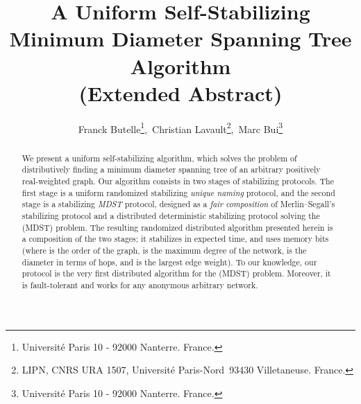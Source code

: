 \documentclass[10pt]{article}
\begin{document}
\title{A Uniform Self-Stabilizing \\
Minimum Diameter Spanning Tree Algorithm \\
{\small (Extended Abstract)}}

\author{Franck Butelle\thanks{Universit\'{e} Paris 10 
- 92000 Nanterre. France.},\  
Christian Lavault\thanks{LIPN, CNRS URA 1507, 
Universit\'{e} Paris-Nord\ 93430 Villetaneuse. France.},\ 
Marc Bui\thanks{Universit\'{e} Paris 10 - 92000 Nanterre. France.}
}
\date{\empty}
\maketitle

\begin{abstract}
We present a uniform self-stabilizing algorithm, which solves the
problem of distributively finding a minimum diameter spanning tree of
an arbitrary positively real-weighted graph. Our algorithm consists
in two stages of stabilizing protocols. The first stage is a uniform
randomized stabilizing {\em unique naming} protocol, and the second
stage is a stabilizing {\em MDST} protocol, designed as a {\em fair
composition} of Merlin--Segall's stabilizing protocol and a
distributed deterministic stabilizing protocol solving the (MDST)
problem. The resulting randomized distributed algorithm presented
herein is a composition of the two stages; it stabilizes in
 expected time, and uses  memory bits (where  is the order of
the graph,  is the maximum degree of the network, 
is the diameter in terms of hops, and  is
the largest edge weight). To our knowledge, our protocol is the very
first distributed algorithm for the (MDST) problem. Moreover, it is
fault-tolerant and works for any anonymous arbitrary network.
\end{abstract}
\end{document}
